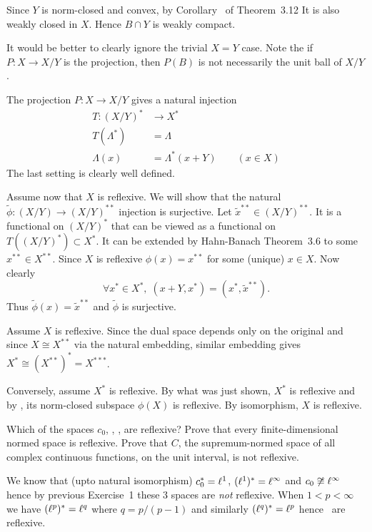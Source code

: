 \begin{enumerate}
\begin{itemize}
Since $Y$ is norm-closed and convex, by Corollary~ of Theorem~3.12
It is also weakly closed in $X$. Hence \(B \cap Y\) is weakly compact.

It would be better to clearly ignore the trivial \(X = Y\) case.
Note the if \(P: X \to X/Y\) is the projection,
then \(P(B)\) is not necessarily the unit ball of \(X/Y\).

The projection \(P:X\to X/Y\) gives a natural injection
\begin{align*}
 T: (X/Y)^* &\to X^* \\
 T(\Lambda^*) &= \Lambda \\
 \Lambda(x) &= \Lambda^*(x + Y) \qquad (x\in X)
\end{align*}
The last setting is clearly well defined.

Assume now that $X$ is reflexive. We will show that the natural
\(\tilde{\phi}:(X/Y) \to (X/Y)^{**}\) 
 injection 
is surjective.
Let \(\tilde{x}^{**} \in (X/Y)^{**}\).
It is a functional on \((X/Y)^*\) 
that can be viewed as a functional on \(T((X/Y)^*) \subset X^*\).
It can be extended by Hahn-Banach Theorem~3.6
to some \(x^{**} \in X^{**}\). Since $X$ is reflexive
\(\phi(x) = x^{**}\) for some (unique) \(x\in X\).
Now clearly
\begin{equation*}
\forall x^* \in X^*,\; (x+Y,x^*) = (x^*,\tilde{x}^{**}).
\end{equation*}
Thus \(\tilde{\phi}(x) = \tilde{x}^{**}\) and \(\tilde{\phi}\)
is surjective.

Assume $X$ is reflexive. Since the dual space depends only on the original
and since \(X \cong X^{**}\) via the natural embedding,
similar embedding gives \(X^* \cong (X^{**})^* = X^{***}\).

Conversely, assume \(X^*\) is reflexive. By what was just shown, 
\(X^*\) is reflexive and by , its norm-closed subspace \(\phi(X)\)
is reflexive. By isomorphism, $X$ is reflexive.
\end{itemize}


\begin{excopy}
Which of the spaces \(c_0\), \ellone, \ellp, \ellinf are reflexive?
Prove that every finite-dimensional
normed space is reflexive. Prove that $C$, the supremum-normed space of all
complex
continuous functions, on the unit interval, is not reflexive.
\end{excopy}

We know that (upto natural isomorphism) 
\(c_0^* = \ell^1\),
\((\ell^1)^* = \ell^\infty\)
and \(c_0 \not\cong \ell^\infty\) hence 
by previous Exercise~1 these 3 spaces are \emph{not} reflexive.
When \(1<p<\infty\) we have \((\ell^p)^* = \ell^q\)
where \(q = p/(p-1)\) and similarly \((\ell^q)^* = \ell^p\)
hence \ellp\ are reflexive.


\end{enumerate}
